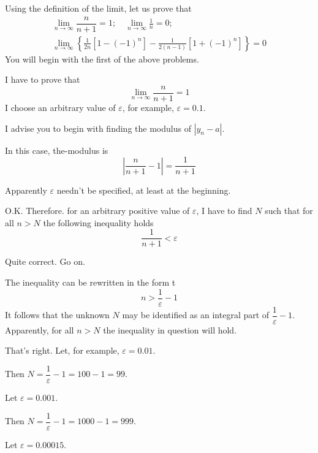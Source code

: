 {Using the definition of the limit, let us prove that 
\begin{equation*}%
\begin{split}
\lim\limits_{n \to \infty} \dfrac{n}{n+1} = 1; \quad \lim\limits_{n \to \infty} \frac{1}{n}= 0;\\
\lim\limits_{n \to \infty} \left\{ \frac{1}{2n} [1 - (-1)^{n}] - \frac{1}{2(n-1)}  [1 + (-1)^{n}] \right\} =0
\end{split}
\end{equation*}
You will begin with the first of the above problems. 

\rdr I have to prove that
\begin{equation*}%
\lim\limits_{n \to \infty} \dfrac{n}{n+1} = 1
\end{equation*}
I choose an arbitrary value of $\varepsilon$, for example, $\varepsilon = 0.1$. 

\athr I advise you to begin with finding the modulus
of $| y_{n}- a|$. 

\rdr In this case, the-modulus is
\begin{equation*}%
\left| \dfrac{n}{n+1} - 1 \right| = \dfrac{1}{n+1} 
\end{equation*}

\athr Apparently $\varepsilon$ needn't be specified, at least at the beginning.

\rdr O.K. Therefore. for an arbitrary positive value of $\varepsilon$, I have to find $N$ such that for all $n > N$ the following inequality holds
\begin{equation*}%
\dfrac{1}{n+1} < \varepsilon
\end{equation*}

\athr Quite correct. Go on.

\rdr The inequality can be rewritten in the form t
\begin{equation*}%
n > \dfrac{1}{\varepsilon} - 1 
\end{equation*}
It follows that the unknown $N$ may be identified as an integral part of $\dfrac{1}{\varepsilon} -	1$. Apparently, for all $n > N$ the inequality in question will hold. 

\athr That's right. Let, for example, $\varepsilon = 0.01$. 

\rdr Then $N = \dfrac{1}{\varepsilon} - 1 = 100 - 1 = 99$.

\athr Let $\varepsilon  = 0.001$.

\rdr Then $N = \dfrac{1}{\varepsilon} - 1 = 1000 - 1 = 999$.

\athr Let $\varepsilon  = 0.00015$.

}
